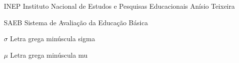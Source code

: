 
\begin{siglas}
    \item[INEP]     Instituto Nacional de Estudos e Pesquisas Educacionais Anísio Teixeira
    \item[SAEB]     Sistema de Avaliação da Educação Básica
  \end{siglas}
  
  \begin{simbolos}
    \item[$ \sigma $]     Letra grega minúscula sigma
    \item[$ \mu $]        Letra grega minúscula mu
  \end{simbolos}
  